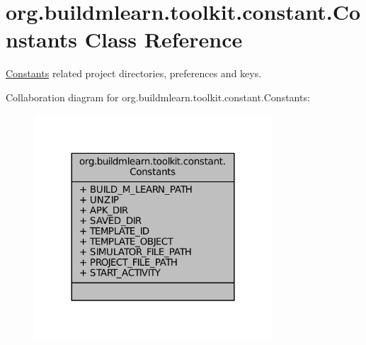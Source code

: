 \hypertarget{classorg_1_1buildmlearn_1_1toolkit_1_1constant_1_1Constants}{\section{org.\-buildmlearn.\-toolkit.\-constant.\-Constants Class Reference}
\label{classorg_1_1buildmlearn_1_1toolkit_1_1constant_1_1Constants}
}


\hyperlink{classorg_1_1buildmlearn_1_1toolkit_1_1constant_1_1Constants}{Constants} related project directories, preferences and keys.  




Collaboration diagram for org.\-buildmlearn.\-toolkit.\-constant.\-Constants\-:
\nopagebreak
\begin{figure}[H]
\begin{center}
\leavevmode
\includegraphics[width=252pt]{d3/d2c/classorg_1_1buildmlearn_1_1toolkit_1_1constant_1_1Constants__coll__graph}
\end{center}
\end{figure}
